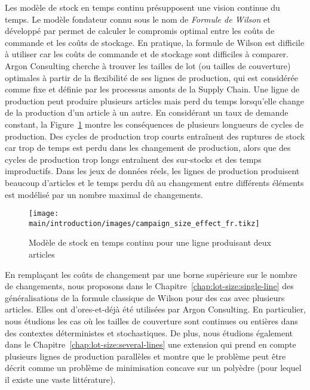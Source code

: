 Les modèle de stock en temps continu présupposent une vision continue du temps.
Le modèle fondateur connu sous le nom de \emph{Formule de Wilson} et développé par \citet{Harris1913} permet de calculer le compromis optimal entre les coûts de commande et les coûts de stockage.
En pratique, la formule de Wilson est difficile à utiliser car les coûts de commande et de stockage sont difficiles à comparer.
Argon Consulting cherche à trouver les tailles de lot (ou tailles de couverture) optimales à partir de la flexibilité de ses lignes de production, qui est considérée comme fixe et définie par les processus amonts de la Supply Chain.
Une ligne de production peut produire plusieurs articles mais perd du temps lorsqu'elle change de la production d'un article à un autre.
En considérant un taux de demande constant, la Figure~\ref{fig:intro:fr:continuous-time-inventory-model} montre les conséquences de plusieurs longueurs de cycles de production.
Des cycles de production trop courts entraînent des ruptures de stock car trop de temps est perdu dans les changement de production, alors que des cycles de production trop longs entraînent des sur-stocks et des temps improductifs.
Dans les jeux de données réels, les lignes de production produisent beaucoup d'articles et le temps perdu dû au changement entre différents éléments est modélisé par un nombre maximal de changements.


\begin{figure}[!ht]
  \centering
  \texttt{[image: main/introduction/images/campaign\_size\_effect\_fr.tikz]}
  \caption{Modèle de stock en temps continu pour une ligne produisant deux articles}
  \label{fig:intro:fr:continuous-time-inventory-model}
\end{figure}


\medskip


En remplaçant les coûts de changement par une borne supérieure sur le nombre de changements, nous proposons dans le Chapitre~\ref{chap:lot-size:single-line} des généralisations de la formule classique de Wilson pour des cas avec plusieurs articles.
Elles ont d'ores-et-déjà été utilisées par Argon Consulting.
En particulier, nous étudions les cas où les tailles de couverture sont continues ou entières dans des contextes déterministes et stochastiques.
De plus, nous étudions également dans le Chapitre~\ref{chap:lot-size:several-lines} une extension qui prend en compte plusieurs lignes de production parallèles et montre que le problème peut être décrit comme un problème de minimisation concave sur un polyèdre (pour lequel il existe une vaste littérature).


